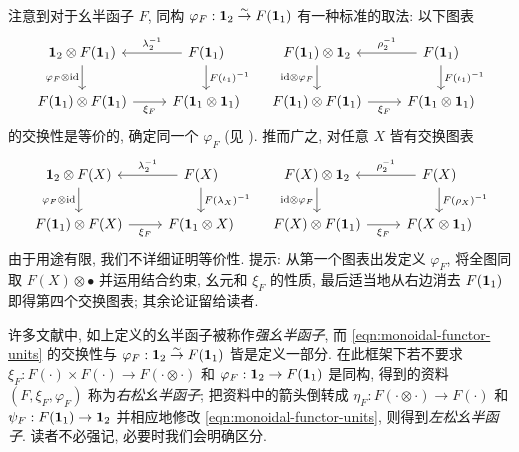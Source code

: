 注意到对于幺半函子 $F$, 同构 $\varphi_F: \mathbf{1}_2 \stackrel{\sim}{\rightarrow} F(\mathbf{1}_1)$ 有一种标准的取法: 以下图表
\begin{equation} \begin{tikzcd}
	\munit_2 \otimes F(\munit_1) \arrow[d, "{\varphi_F \otimes \identity}"'] & F(\munit_1) \arrow[l, "{\lambda_2^{-1}}"'] \arrow[d, "{F(\iota_1)^{-1}}"] \\
	F(\munit_1) \otimes F(\munit_1) \arrow[r, "{\xi_F}"'] & F(\munit_1 \otimes \munit_1)
\end{tikzcd} \quad
\begin{tikzcd}
	F(\munit_1) \otimes \munit_2 \arrow[d, "{\identity \otimes \varphi_F}"'] & F(\munit_1) \arrow[l, "{\rho_2^{-1}}"'] \arrow[d, "{F(\iota_1)^{-1}}"] \\
	F(\munit_1) \otimes F(\munit_1) \arrow[r, "{\xi_F}"'] & F(\munit_1 \otimes \munit_1)
\end{tikzcd} \end{equation}
的交换性是等价的, 确定同一个 $\varphi_F$ (见 \cite[Proposition 2.4.3]{EGNO15}). 推而广之, 对任意 $X$ 皆有交换图表
\begin{equation}\label{eqn:monoidal-functor-units} \begin{tikzcd}
	\munit_2 \otimes F(X) \arrow[d, "{\varphi_F \otimes \identity}"'] & F(X) \arrow[l, "{\lambda_2^{-1}}"'] \arrow[d, "{F(\lambda_X)^{-1}}"] \\
	F(\munit_1) \otimes F(X) \arrow[r, "{\xi_F}"'] & F(\munit_1 \otimes X)
\end{tikzcd} \quad
\begin{tikzcd}
	F(X) \otimes \munit_2 \arrow[d, "{\identity \otimes \varphi_F}"'] & F(X) \arrow[l, "{\rho_2^{-1}}"']  \arrow[d, "{F(\rho_X)^{-1}}"] \\
	F(X) \otimes F(\munit_1) \arrow[r, "{\xi_F}"'] & F(X \otimes \munit_1)
\end{tikzcd} \end{equation}
由于用途有限, 我们不详细证明等价性. 提示: 从第一个图表出发定义 $\varphi_F$, 将全图同取 $F(X) \otimes \bullet$ 并运用结合约束, 幺元和 $\xi_F$ 的性质, 最后适当地从右边消去 $F(\mathbf{1}_1)$ 即得第四个交换图表; 其余论证留给读者.

\begin{remark}
	许多文献中, 如上定义的幺半函子被称作\emph{强幺半函子}, 而 \eqref{eqn:monoidal-functor-units} 的交换性与 $\varphi_F: \mathbf{1}_2 \stackrel{\sim}{\rightarrow} F(\mathbf{1}_1)$ 皆是定义一部分. 在此框架下若不要求 $\xi_F: F(\cdot) \times F(\cdot) \to F(\cdot \otimes \cdot)$ 和 $\varphi_F: \mathbf{1}_2 \to F(\mathbf{1}_1)$ 是同构, 得到的资料 $(F, \xi_F, \varphi_F)$ 称为\emph{右松幺半函子}; 把资料中的箭头倒转成 $\eta_F: F(\cdot \otimes \cdot) \to F(\cdot)$ 和 $\psi_F: F(\mathbf{1}_1) \to \mathbf{1}_2$ 并相应地修改 \eqref{eqn:monoidal-functor-units}, 则得到\emph{左松幺半函子}. 读者不必强记, 必要时我们会明确区分. 
\end{remark}

